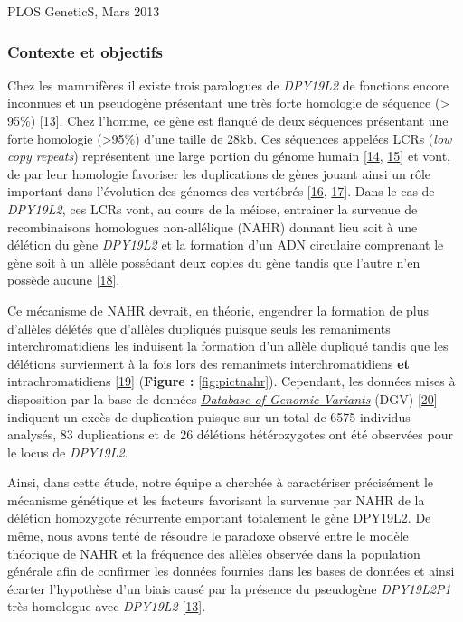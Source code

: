\documentclass[12pt,twoside]{ugathesis}
\begin{document}
PLOS GeneticS, Mars 2013

\newpage

\subsubsection{Contexte et objectifs}\label{contexte-et-objectifs-5}

Chez les mammifères il existe trois paralogues de \emph{DPY19L2} de
fonctions encore inconnues et un pseudogène présentant une très forte
homologie de séquence (\textgreater{} 95\%)
{[}\protect\hyperlink{ref-Carson2006}{13}{]}. Chez l'homme, ce gène est
flanqué de deux séquences présentant une forte homologie
(\textgreater{}95\%) d'une taille de 28kb. Ces séquences appelées LCRs
(\emph{low copy repeats}) représentent une large portion du génome
humain {[}\protect\hyperlink{ref-Cheung2003}{14},
\protect\hyperlink{ref-Bailey2002}{15}{]} et vont, de par leur homologie
favoriser les duplications de gènes jouant ainsi un rôle important dans
l'évolution des génomes des vertébrés
{[}\protect\hyperlink{ref-Walsh2003}{16},
\protect\hyperlink{ref-Ohno1970}{17}{]}. Dans le cas de \emph{DPY19L2},
ces LCRs vont, au cours de la méiose, entrainer la survenue de
recombinaisons homologues non-allélique (NAHR) donnant lieu soit à une
délétion du gène \emph{DPY19L2} et la formation d'un ADN circulaire
comprenant le gène soit à un allèle possédant deux copies du gène tandis
que l'autre n'en possède aucune
{[}\protect\hyperlink{ref-Harbuz2011a}{18}{]}.

Ce mécanisme de NAHR devrait, en théorie, engendrer la formation de plus
d'allèles délétés que d'allèles dupliqués puisque seuls les remaniments
interchromatidiens les induisent la formation d'un allèle dupliqué
tandis que les délétions surviennent à la fois lors des remanimets
interchromatidiens \textbf{et} intrachromatidiens
{[}\protect\hyperlink{ref-Liu2012}{19}{]} (\textbf{Figure :
}\ref{fig:pictnahr}). Cependant, les données mises à disposition par la
base de données \href{http://dgv.tcag.ca/dgv/app/home}{\emph{Database of
Genomic Variants}} (DGV) {[}\protect\hyperlink{ref-MacDonald2014}{20}{]}
indiquent un excès de duplication puisque sur un total de 6575 individus
analysés, 83 duplications et de 26 délétions hétérozygotes ont été
observées pour le locus de \emph{DPY19L2}.

Ainsi, dans cette étude, notre équipe a cherchée à caractériser
précisément le mécanisme génétique et les facteurs favorisant la
survenue par NAHR de la délétion homozygote récurrente emportant
totalement le gène DPY19L2. De même, nous avons tenté de résoudre le
paradoxe observé entre le modèle théorique de NAHR et la fréquence des
allèles observée dans la population générale afin de confirmer les
données fournies dans les bases de données et ainsi écarter l'hypothèse
d'un biais causé par la présence du pseudogène \emph{DPY19L2P1} très
homologue avec \emph{DPY19L2}
{[}\protect\hyperlink{ref-Carson2006}{13}{]}.
\end{document}
